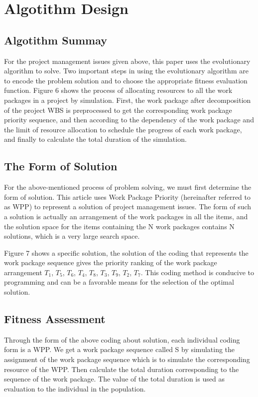 
\section{Algotithm Design}

\subsection{Algotithm Summay}
%
For the project management issues given above, this paper uses the
evolutionary algorithm to solve. Two important steps in using the
evolutionary algorithm are to encode the problem solution and to
choose the appropriate fitness evaluation function. Figure 6 shows the
process of allocating resources to all the work packages in a project
by simulation.  First, the work package after decomposition of the
project WBS is preprocessed to get the corresponding work package
priority sequence, and then according to the dependency of the work
package and the limit of resource allocation to schedule the progress
of each work package, and finally to calculate the total duration of
the simulation.

\subsection{The Form of Solution}
%
For the above-mentioned process of problem solving, we must first
determine the form of solution. This article uses Work Package
Priority (hereinafter referred to as WPP) to represent a solution of
project management issues. The form of such a solution is actually an
arrangement of the work packages in all the items, and the solution
space for the items containing the N work packages contains N
solutions, which is a very large search space.


Figure 7 shows a specific solution, the solution of the coding that
represents the work package sequence gives the priority ranking of the
work package arrangement $T_1$, $T_5$, $T_6$, $T_4$, $T_8$, $T_3$,
$T_9$, $T_2$, $T_7$. This coding method is conducive to programming
and can be a favorable means for the selection of the optimal
solution.


\subsection{Fitness Assessment}
%
Through the form of the above coding about solution, each individual
coding form is a WPP. We get a work package sequence called S by
simulating the assignment of the work package sequence which is to
simulate the corresponding resource of the WPP. Then calculate the
total duration corresponding to the sequence of the work package. The
value of the total duration is used as evaluation to the individual in
the population.

